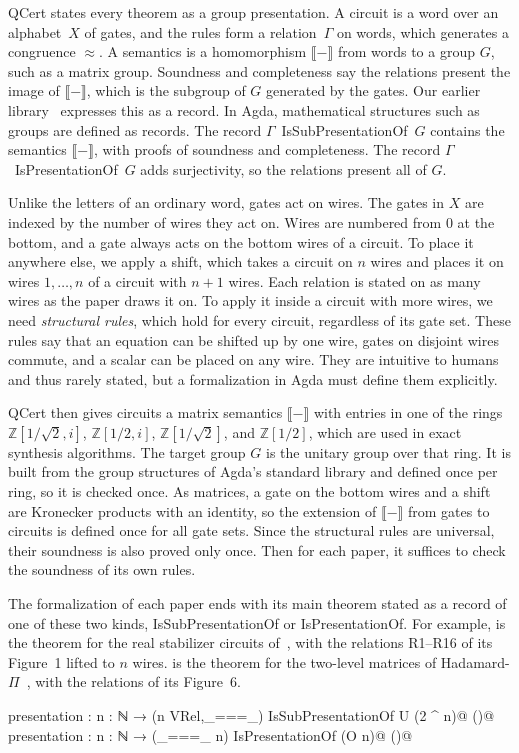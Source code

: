\documentclass[acmsmall,nonacm,11pt,screen]{acmart}
\newcommand{\aid}[1]{\mbox{\textsf{\small #1}}}
\newcounter{agdastmt}
\newcommand{\agdatag}[1]{\hfill\normalfont\normalsize
  \refstepcounter{agdastmt}(\theagdastmt)\label{#1}}
\newcommand{\Z}{\mathbb{Z}}
\begin{document}
QCert states every theorem as a group presentation. A circuit is a word over an alphabet~$X$ of gates, and the rules form a relation~$\Gamma$ on words, which generates a congruence $\approx$. A semantics is a homomorphism $\llbracket - \rrbracket$ from words to a group $G$, such as a matrix group. Soundness and completeness say the relations present the image of $\llbracket - \rrbracket$, which is the subgroup of $G$ generated by the gates. Our earlier library~\cite{bian2027popl} expresses this as a record. In Agda, mathematical structures such as groups are defined as records. The record $\Gamma$~\aid{IsSubPresentationOf}~$G$ contains the semantics $\llbracket - \rrbracket$, with proofs of soundness and completeness. The record $\Gamma$~\aid{IsPresentationOf}~$G$ adds surjectivity, so the relations present all of $G$.

Unlike the letters of an ordinary word, gates act on wires. The gates in $X$ are indexed by the number of wires they act on. Wires are numbered from $0$ at the bottom, and a gate always acts on the bottom wires of a circuit. To place it anywhere else, we apply a shift, which takes a circuit on $n$ wires and places it on wires $1,\dots,n$ of a circuit with $n+1$ wires. Each relation is stated on as many wires as the paper draws it on. To apply it inside a circuit with more wires, we need \emph{structural rules}, which hold for every circuit, regardless of its gate set. These rules say that an equation can be shifted up by one wire, gates on disjoint wires commute, and a scalar can be placed on any wire. They are intuitive to humans and thus rarely stated, but a formalization in Agda must define them explicitly.

QCert then gives circuits a matrix semantics $\llbracket - \rrbracket$ with entries in one of the rings $\Z\left[1/\sqrt2,i\right]$, $\Z\left[1/2,i\right]$, $\Z\left[1/\sqrt2\right]$, and $\Z\left[1/2\right]$, which are used in exact synthesis algorithms. The target group $G$ is the unitary group over that ring. It is built from the group structures of Agda's standard library and defined once per ring, so it is checked once. As matrices, a gate on the bottom wires and a shift are Kronecker products with an identity, so the extension of $\llbracket - \rrbracket$ from gates to circuits is defined once for all gate sets. Since the structural rules are universal, their soundness is also proved only once. Then for each paper, it suffices to check the soundness of its own rules.

The formalization of each paper ends with its main theorem stated as a record of one of these two kinds, \aid{IsSubPresentationOf} or \aid{IsPresentationOf}. For example,  is the theorem for the real stabilizer circuits of~\cite{makary2021real}, with the relations R1--R16 of its Figure~1 lifted to $n$ wires.  is the theorem for the two-level matrices of Hadamard-$\Pi$~\cite{fang2026hadamard}, with the relations of its Figure~6.
\begin{agdacode}[escapechar=@]
presentation : {n : ℕ} → (n VRel,_===_) IsSubPresentationOf U (2 ^ n)@\agdatag{agda:stab}@
presentation : {n : ℕ} → (_===_ {n}) IsPresentationOf (O n)@\agdatag{agda:hpi}@
\end{agdacode}
\end{document}
